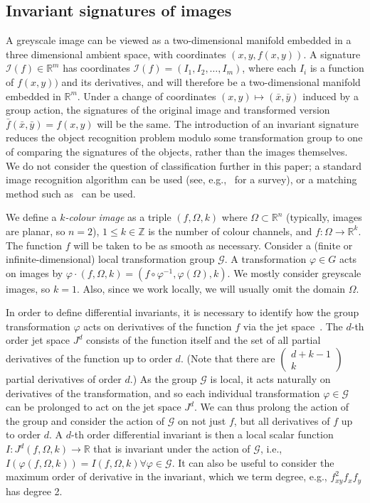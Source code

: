 \documentclass[review,onefignum,onetabnum]{siamonline190516}
\def\R{\mathbb{R}}
\begin{document}
\subsection{Invariant signatures of images}

A greyscale image can be viewed as a two-dimensional manifold embedded in a three dimensional ambient space, with coordinates $(x, y, f(x,y))$. A signature $\mathcal{I}(f) \in \mathbb{R}^m$ has coordinates $\mathcal{I}(f) = (I_1, I_2, \ldots, I_m)$, where each $I_i$ is a function of $f(x, y))$ and its derivatives, and will therefore be a two-dimensional manifold embedded in $\mathbb{R}^m$. Under a change of coordinates $(x, y) \mapsto (\bar{x}, \bar{y})$ induced by a group action, the signatures of the original image and transformed version $\bar{f}(\bar{x}, \bar{y}) = f(x, y)$ will be the same. The introduction of an invariant signature reduces the object recognition problem modulo some transformation group to one of comparing the signatures of the objects, rather than the images themselves. We do not consider the question of classification further in this paper; a standard image recognition algorithm can be used (see, e.g.,~\citet{Zhang20} for a survey), or a matching method such as~\citet{UsCurrents} can be used.

We define a {\em $k$-colour image} as a triple $(f,\Omega,k)$ where $\Omega\subset\R^n$ (typically, images are planar, so $n=2$), $1\le k\in\mathbb{Z}$ is the number of colour channels, and $f\colon\Omega\to\R^k$. The function $f$ will be taken to be as smooth as necessary. Consider a (finite or infinite-dimensional) local transformation group $\mathcal{G}$.  A transformation $\varphi\in G$ acts on images by $\varphi\cdot (f,\Omega,k) = (f\circ\varphi^{-1},\varphi(\Omega),k)$. We mostly consider greyscale images, so $k=1$. Also, since we work locally, we will usually omit the domain $\Omega$.

In order to define differential invariants, it is necessary to identify how the group transformation $\varphi$ acts on derivatives of the function $f$ via the jet space~\citep{OlverEIS}. The $d$-th order jet space $J^d$ consists of the function itself and the set of all partial derivatives of the function up to order $d$. (Note that there are $\left( \begin{array}{c} d+k-1 \\ k \end{array} \right)$ partial derivatives of order $d$.) As the group $\mathcal{G}$ is local, it acts naturally on derivatives of the transformation, and so each individual transformation $\varphi \in \mathcal{G}$ can be prolonged to act on the jet space $J^d$. We can thus prolong the action of the group and consider the action of $\mathcal{G}$ on not just $f$, but all derivatives of $f$ up to order $d$. A $d$-th order differential invariant is then a local scalar function $I: J^{d} (f,\Omega, k) \to \mathbb{R}$ that is invariant under the action of $\mathcal{G}$, i.e., $I(\varphi(f,\Omega, k)) = I(f, \Omega, k) \forall \varphi \in \mathcal{G}$. It can also be useful to consider the maximum order of derivative in the invariant, which we term degree, e.g., $f_{xy}^2 f_x f_y$ has degree 2. 
\end{document}
